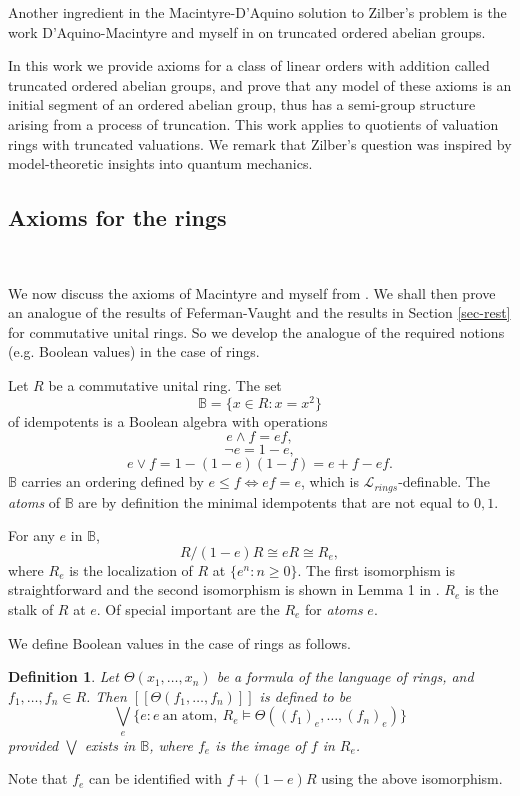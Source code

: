 \documentclass[12pt]{amsart}
\def\B{\mathbb{B}}
\def\cL{\mathcal{L}}
\def\cL{\mathcal{L}}
\newtheorem{Def}{Definition}[section]
\numberwithin{equation}{section}
\begin{document}
Another ingredient in the Macintyre-D'Aquino solution to Zilber's problem is the work D'Aquino-Macintyre and myself in \cite{dpm} on truncated ordered abelian groups. 

In this work we provide axioms for a class of linear orders with addition called truncated ordered abelian groups, and prove that any model of these axioms is an initial segment of an ordered abelian group, thus has a semi-group structure arising from a process of truncation. 
This work applies to quotients of valuation rings with truncated valuations. We remark that Zilber's question 
was inspired by model-theoretic insights into quantum mechanics.

\medskip

\subsection{\bf Axioms for the rings}

\

\medskip

We now discuss the axioms of Macintyre and myself from \cite{DM-axioms}. We shall then 
prove an analogue of the results of Feferman-Vaught \cite{FV} and the results in Section \ref{sec-rest} for commutative unital rings. So we develop the analogue of the required notions (e.g. Boolean values) in the case of rings. 

Let $R$ be a commutative unital ring. The set 
$$\B=\{x\in R: x=x^2\}$$ 
of idempotents 
is a Boolean algebra with operations  
$$e \wedge f=ef,$$
$$\neg e=1-e,$$
$$e\vee f=1-(1-e)(1-f)=e+f-ef.$$
$\B$ carries an ordering defined by 
$e\leq f\Leftrightarrow ef=e$, which is $\cL_{rings}$-definable. The {\it atoms} of $\B$ are by definition the minimal idempotents that are not equal to $0,1$. 

For any $e$ in $\B$, 
$$R/(1-e)R \cong eR \cong R_e,$$
where $R_e$ is the localization of $R$ at $\{e^n: n\geq 0\}$. The first isomorphism is straightforward and the second isomorphism is shown in Lemma 1 in \cite{elem-prod}. $R_e$ is the stalk of $R$ at $e$. Of special important are the $R_e$ for {\it atoms} $e$.

We define Boolean values in the case of rings as follows. 
\begin{Def} Let $\Theta(x_1,\dots,x_n)$ be a formula of the language of rings, and $f_1,\dots,f_n\in R$. Then 
$[[\Theta(f_1,\dots,f_n)]]$ is defined to be 
$$\bigvee_{e} \{e: e~\text{an~atom},~R_e\models \Theta((f_1)_e,\dots,(f_n)_e)\}$$
provided $\bigvee$ exists in $\B$, where $f_e$ is the image of $f$ in $R_e$.\end{Def}
Note that $f_e$ can be identified with $f+(1-e)R$ using the above isomorphism.
\end{document}
